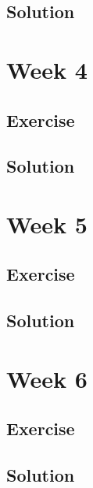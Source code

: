 \documentclass[
]{book}
\begin{document}
\hypertarget{solution-2}{%
\section{Solution}\label{solution-2}}

\hypertarget{week-4}{%
\chapter{Week 4}\label{week-4}}

\hypertarget{exercise-2}{%
\section{Exercise}\label{exercise-2}}

\hypertarget{solution-3}{%
\section{Solution}\label{solution-3}}

\hypertarget{week-5}{%
\chapter{Week 5}\label{week-5}}

\hypertarget{exercise-3}{%
\section{Exercise}\label{exercise-3}}

\hypertarget{solution-4}{%
\section{Solution}\label{solution-4}}

\hypertarget{week-6}{%
\chapter{Week 6}\label{week-6}}

\hypertarget{exercise-4}{%
\section{Exercise}\label{exercise-4}}

\hypertarget{solution-5}{%
\section{Solution}\label{solution-5}}
\end{document}
